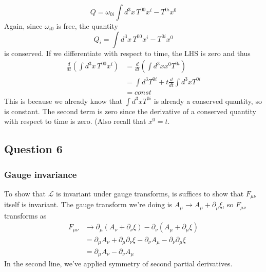 \documentclass[11pt, oneside]{article}   	%
\theoremstyle{newline}
\theoremstyle{newline}
\theoremstyle{newline}
\theoremstyle{newline}
\theoremstyle{newline}
\begin{document}
\[ 
Q = \omega_{ 0i} \int d^3 x \, T^{ 00} x^i - T^{ 0i }x^0 
\] 
Again, since $\omega_{ i0} $ is free, the quantity 
\[ 
Q_i = \int d^3 x \, T^{ 00} x^i - T^{ 0i }x^0 
\]
is conserved. If we differentiate with respect to time, the LHS is zero and thus 
\begin{align*} 
\frac{d}{ dt} \left( \int d^3 x \, T^{ 00} x^i \right) &= \frac{ d}{ dt } \left( \int d^3 x x^0 T^{ 0i } \right) \\
& = \int d^3 T^{ 0i } + t \frac{d}{ dt } \int d^3 x T^{0i} \\
& = const
\end{align*} 
This is because we already know that $\int d^3 x T^{ 0i  } $ is already a conserved quantity, so is constant. The second term is zero since the derivative of a conserved quantity with respect to time is zero. (Also recall that $x^0 = t $. 
\pagebreak 
\subsection{Question 6}
\subsubsection{Gauge invariance}  
To show that $\mathcal{L}$ is invariant under gauge transforms, is suffices to show that $F_{\mu \nu}$ itself is invariant. The gauge transform we're doing is $A_\mu \rightarrow A_\mu + \partial_\mu \xi $, so $F_{ \mu\nu}$  transforms as 
\begin{align*}  
F_{ \mu \nu} & \rightarrow \partial_\mu ( A_\nu + \partial_\nu \xi)  - \partial_\nu ( A_\mu + \partial_\mu \xi ) \\
& = \partial_\mu A_\nu + \partial_\mu \partial_\nu \xi  - \partial_\nu A_\mu  - \partial_\nu \partial_\mu \xi \\ 
&= \partial_\mu A_\nu - \partial_\nu A_\mu 
\end{align*} 
In the second line, we've applied symmetry of second partial derivatives. 
\end{document}
